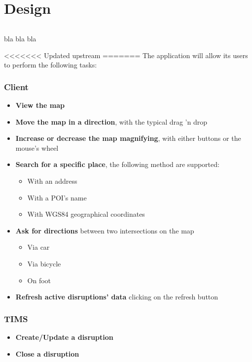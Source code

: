 
\part{Design}

\paragraph{}
bla bla bla



<<<<<<< Updated upstream
=======
The application will allow its users to perform the following tasks:

\section{Client}

\begin{itemize}
	\item \textbf{View the map}
	\item \textbf{Move the map in a direction}, with the typical drag 'n drop
	\item \textbf{Increase or decrease the map magnifying}, with either buttons 
	or the mouse's wheel
	\item \textbf{Search for a specific place}, the following method are 
	supported:
	\begin{itemize}
		\item With an address
		\item With a POI's name
		\item With WGS84 geographical coordinates
	\end{itemize}
	\item \textbf{Ask for directions} between two intersections on the map
	\begin{itemize}
		\item Via car
		\item Via bicycle
		\item On foot
	\end{itemize}
	\item \textbf{Refresh active disruptions' data} clicking on the refresh button
\end{itemize}
\section{TIMS}
	\begin{itemize}
	\item \textbf{Create/Update a disruption}
	\item \textbf{Close a disruption}
	
	\end{itemize}
